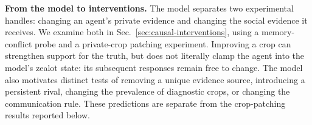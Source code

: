 \textbf{From the model to interventions.} The model separates two experimental handles: changing an agent's private evidence and changing the social evidence it receives. We examine both in Sec.~\ref{sec:causal-interventions}, using a memory-conflict probe and a private-crop patching experiment. Improving a crop can strengthen support for the truth, but does not literally clamp the agent into the model's zealot state: its subsequent responses remain free to change. The model also motivates distinct tests of removing a unique evidence source, introducing a persistent rival, changing the prevalence of diagnostic crops, or changing the communication rule. These predictions are separate from the crop-patching results reported below.

